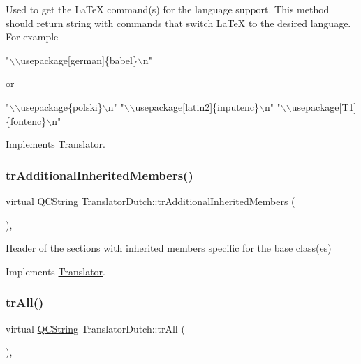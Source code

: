 Used to get the La\+TeX command(s) for the language support. This method should return string with commands that switch La\+TeX to the desired language. For example 
\begin{DoxyPre}"\(\backslash\)\(\backslash\)usepackage[german]\{babel\}\(\backslash\)n"
\end{DoxyPre}
 or 
\begin{DoxyPre}"\(\backslash\)\(\backslash\)usepackage\{polski\}\(\backslash\)n"
"\(\backslash\)\(\backslash\)usepackage[latin2]\{inputenc\}\(\backslash\)n"
"\(\backslash\)\(\backslash\)usepackage[T1]\{fontenc\}\(\backslash\)n"
\end{DoxyPre}
 

Implements \mbox{\hyperlink{class_translator}{Translator}}.

\mbox{\label{class_translator_dutch_aea70696a03972772e91e355296fb3681}} 
\subsubsection{\texorpdfstring{trAdditionalInheritedMembers()}{trAdditionalInheritedMembers()}}
{\footnotesize\ttfamily virtual \mbox{\hyperlink{class_q_c_string}{Q\+C\+String}} Translator\+Dutch\+::tr\+Additional\+Inherited\+Members (\begin{DoxyParamCaption}{ }\end{DoxyParamCaption})\hspace{0.3cm}{\ttfamily [inline]}, {\ttfamily [virtual]}}

Header of the sections with inherited members specific for the base class(es) 

Implements \mbox{\hyperlink{class_translator}{Translator}}.

\mbox{\label{class_translator_dutch_a2a889af1a3cfcaec26294de4ecff96c2}} 
\subsubsection{\texorpdfstring{trAll()}{trAll()}}
{\footnotesize\ttfamily virtual \mbox{\hyperlink{class_q_c_string}{Q\+C\+String}} Translator\+Dutch\+::tr\+All (\begin{DoxyParamCaption}{ }\end{DoxyParamCaption})\hspace{0.3cm}{\ttfamily [inline]}, {\ttfamily [virtual]}}


